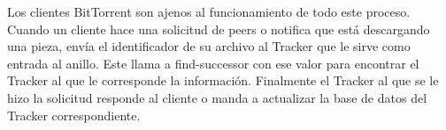 \documentclass[article]{llncs}
\begin{document}
Los clientes BitTorrent son ajenos al funcionamiento de todo este proceso. Cuando un cliente hace una solicitud de peers o notifica 
que está descargando una pieza, envía el identificador de su archivo al Tracker que le sirve como entrada al anillo. Este llama a find-successor 
con ese valor para encontrar el Tracker al que le corresponde la información. Finalmente el Tracker al que se le hizo la solicitud responde al cliente 
o manda a actualizar la base de datos del Tracker correspondiente.
\end{document}
